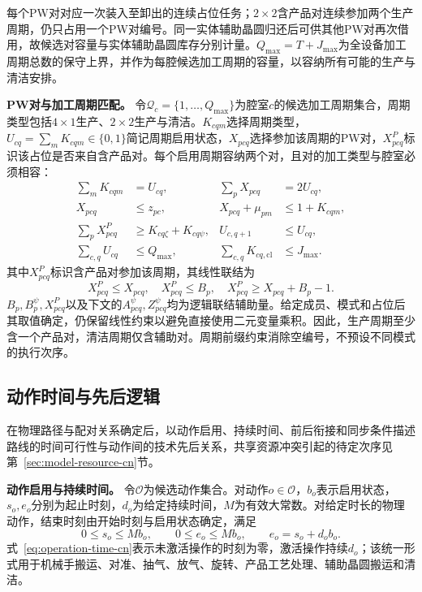 \documentclass[final,5p,times,twocolumn]{elsarticle}
\begin{document}
每个PW对对应一次装入至卸出的连续占位任务；$2\times2$含产品对连续参加两个生产周期，仍只占用一个PW对编号。同一实体辅助晶圆归还后可供其他PW对再次借用，故候选对容量与实体辅助晶圆库存分别计量。$Q_{\max}=T+J_{\max}$为全设备加工周期总数的保守上界，并作为每腔候选加工周期的容量，以容纳所有可能的生产与清洁安排。

\noindent\textbf{PW对与加工周期匹配。}
令$\mathcal Q_c=\{1,\ldots,Q_{\max}\}$为腔室$c$的候选加工周期集合，周期类型包括$4\times1$生产、$2\times2$生产与清洁。$K_{cqm}$选择周期类型，$U_{cq}=\sum_mK_{cqm}\in\{0,1\}$简记周期启用状态，$X_{pcq}$选择参加该周期的PW对，$X^P_{pcq}$标识该占位是否来自含产品对。每个启用周期容纳两个对，且对的加工类型与腔室必须相容：
\begin{equation}
\begin{aligned}
\sum_mK_{cqm}&=U_{cq}, &\sum_pX_{pcq}&=2U_{cq},\\
X_{pcq}&\le z_{pc}, &X_{pcq}+\mu_{pm}&\le1+K_{cqm},\\
\sum_pX^P_{pcq}&\ge K_{cq\zeta}+K_{cq\psi}, &U_{c,q+1}&\le U_{cq},\\
\sum_{c,q}U_{cq}&\le Q_{\max}, &\sum_{c,q}K_{cq,\mathrm{cl}}&\le J_{\max}.
\end{aligned}
\label{eq:cycle-capacity-cn}
\end{equation}
其中$X^P_{pcq}$标识含产品对参加该周期，其线性联结为
\begin{equation}
X^P_{pcq}\le X_{pcq},\quad X^P_{pcq}\le B_p,\quad
X^P_{pcq}\ge X_{pcq}+B_p-1.
\label{eq:cycle-products-cn}
\end{equation}
$B_p,B_p^{\psi},X^P_{pcq}$以及下文的$A^{\psi}_{pcq},Z^{\psi}_{pcq}$均为逻辑联结辅助量。给定成员、模式和占位后其取值确定，仍保留线性约束以避免直接使用二元变量乘积。因此，生产周期至少含一个产品对，清洁周期仅含辅助对。周期前缀约束消除空编号，不预设不同模式的执行次序。

\subsection{动作时间与先后逻辑}
\label{sec:model-time-cn}

在物理路径与配对关系确定后，以动作启用、持续时间、前后衔接和同步条件描述路线的时间可行性与动作间的技术先后关系，共享资源冲突引起的待定次序见第~\ref{sec:model-resource-cn}节。

\noindent\textbf{动作启用与持续时间。}
令$\mathcal O$为候选动作集合。对动作$o\in\mathcal O$，$b_o$表示启用状态，$s_o,e_o$分别为起止时刻，$d_o$为给定持续时间，$M$为有效大常数。对给定时长的物理动作，结束时刻由开始时刻与启用状态确定，满足
\begin{equation}
0\le s_o\le Mb_o,\qquad
0\le e_o\le Mb_o,\qquad
e_o=s_o+d_ob_o.
\label{eq:operation-time-cn}
\end{equation}
式~\eqref{eq:operation-time-cn}表示未激活操作的时刻为零，激活操作持续$d_o$；该统一形式用于机械手搬运、对准、抽气、放气、旋转、产品工艺处理、辅助晶圆搬运和清洁。
\end{document}
